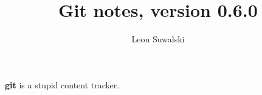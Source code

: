\documentclass{charun}
\title{Git notes, version 0.6.0}
\author{Leon Suwalski}
\begin{document}
\begin{multicols*}{2}
\maketitle
\raggedright

\textbf{git} is a stupid content tracker.









\end{multicols*}
\end{document}
